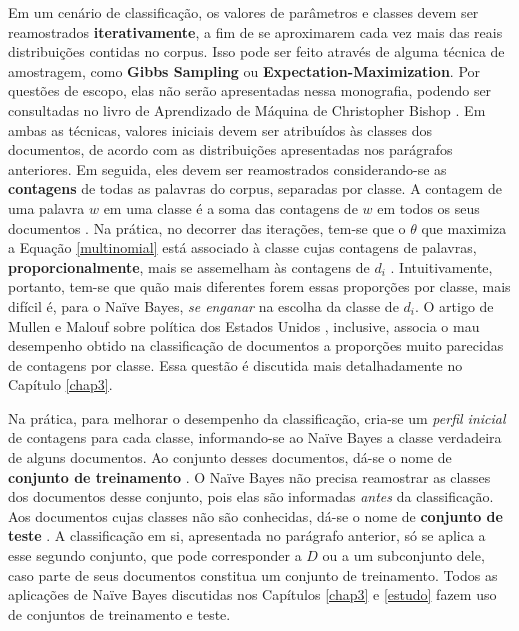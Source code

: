 Em um cenário de classificação, os valores de parâmetros e classes devem ser reamostrados \textbf{iterativamente}, a fim de se aproximarem cada vez mais das reais distribuições contidas no corpus. Isso pode ser feito através de alguma técnica de amostragem, como \textbf{Gibbs Sampling} ou \textbf{Expectation-Maximization}. Por questões de escopo, elas não serão apresentadas nessa monografia, podendo ser consultadas no livro de Aprendizado de Máquina de Christopher Bishop \cite{bishop}. Em ambas as técnicas, valores iniciais devem ser atribuídos às classes dos documentos, de acordo com as distribuições apresentadas nos parágrafos anteriores. Em seguida, eles devem ser reamostrados considerando-se as \textbf{contagens} de todas as palavras do corpus, separadas por classe. A contagem de uma palavra \ensuremath{w} em uma classe é a soma das contagens de \ensuremath{w} em todos os seus documentos \cite{resnik}. Na prática, no decorrer das iterações, tem-se que o \ensuremath{\theta} que maximiza a Equação \ref{multinomial} está associado à classe cujas contagens de palavras, \textbf{proporcionalmente}, mais se assemelham às contagens de \ensuremath{d_i} \cite{resnik}.  Intuitivamente, portanto, tem-se que quão mais diferentes forem essas proporções por classe, mais difícil é, para o Naïve Bayes, \emph{se enganar} na escolha da classe de \ensuremath{d_i}. O artigo de Mullen e Malouf sobre política dos Estados Unidos \cite{aaai-politics}, inclusive, associa o mau desempenho obtido na classificação de documentos a proporções muito parecidas de contagens por classe. Essa questão é discutida mais detalhadamente no Capítulo \ref{chap3}. %


Na prática, para melhorar o desempenho da classificação, cria-se um \emph{perfil inicial} de contagens para cada classe, informando-se ao Naïve Bayes a classe verdadeira de alguns documentos. Ao conjunto desses documentos, dá-se o nome de \textbf{conjunto de treinamento} \cite{bishop}. O Naïve Bayes não precisa reamostrar as classes dos documentos desse conjunto, pois elas são informadas \emph{antes} da classificação. Aos documentos cujas classes não são conhecidas, dá-se o nome de \textbf{conjunto de teste} \cite{bishop}. A classificação em si, apresentada no parágrafo anterior, só se aplica a esse segundo conjunto, que pode corresponder a \ensuremath{D} ou a um subconjunto dele, caso parte de seus documentos constitua um conjunto de treinamento. Todos as aplicações de Naïve Bayes discutidas nos Capítulos \ref{chap3} e \ref{estudo} fazem uso de conjuntos de treinamento e teste.

